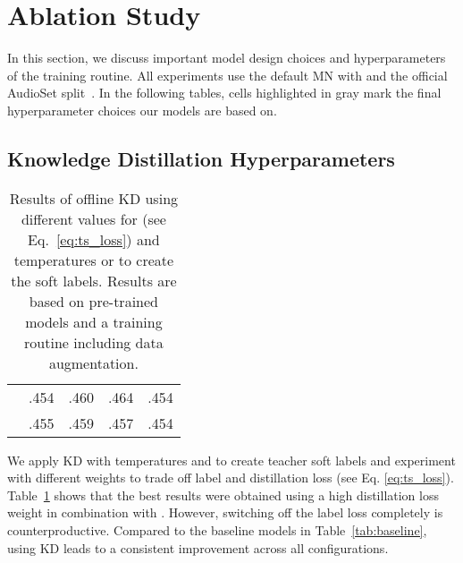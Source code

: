 \documentclass{article}
\begin{document}
\vspace{-6pt}
\section{Ablation Study}
\label{sec:ablation}








In this section, we discuss important model design choices and hyperparameters of the training routine. All experiments use the default MN with  and the official AudioSet split~\cite{audioset2017Gemmeke}. In the following tables, cells highlighted in gray mark the final hyperparameter choices our models are based on.

\vspace{-6pt}
\subsection{Knowledge Distillation Hyperparameters}
\vspace{-4pt}
\begin{table}[b]
\begin{center}
\begin{small}
\begin{tabular}{c|cccc}
&  &  & \cellcolor{lightgray}  &  \\ 
\midrule
\cellcolor{lightgray} & .454 & .460 & .464 & .454 \\
 & .455 & .459 & .457 & .454 \\
\bottomrule
\end{tabular}
\caption{Results of offline KD using different values for  (see Eq.~\ref{eq:ts_loss}) and temperatures  or  to create the soft labels. Results are based on pre-trained models and a training routine including data augmentation.} 
\label{tab:kd}
\end{small}
\end{center}
\vspace{-14pt}
\end{table}

We apply KD with temperatures  and  to create teacher soft labels and experiment with different weights  to trade off label and distillation loss (see Eq. \ref{eq:ts_loss}). Table~\ref{tab:kd} shows that the best results were obtained using a high distillation loss weight in combination with . However, switching off the label loss  completely is counterproductive. Compared to the baseline models in Table~\ref{tab:baseline}, using KD leads to a consistent improvement across all configurations.
\end{document}

